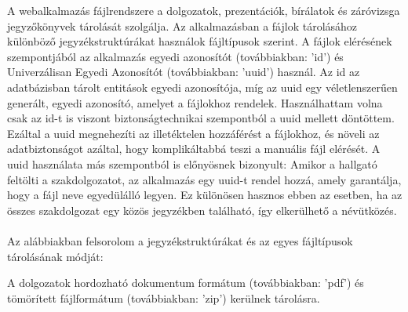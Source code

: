 


A webalkalmazás fájlrendszere a dolgozatok, prezentációk, bírálatok és záróvizsga jegyzőkönyvek tárolását szolgálja. Az alkalmazásban a fájlok tárolásához különböző jegyzékstruktúrákat használok  fájltípusok szerint. A fájlok elérésének szempontjából az alkalmazás egyedi azonosítót (továbbiakban: 'id') és Univerzálisan Egyedi Azonosítót (továbbiakban: 'uuid') használ. Az id az adatbázisban tárolt entitások egyedi azonosítója, míg az uuid egy véletlenszerűen generált, egyedi azonosító, amelyet a fájlokhoz rendelek. Használhattam volna csak az id-t is viszont biztonságtechnikai szempontból a uuid mellett döntöttem. Ezáltal a uuid megnehezíti az illetéktelen hozzáférést a fájlokhoz, és növeli az adatbiztonságot azáltal, hogy komplikáltabbá teszi a manuális fájl elérését. A uuid használata más szempontból is előnyösnek bizonyult: Amikor a hallgató feltölti a szakdolgozatot, az alkalmazás egy uuid-t rendel hozzá, amely garantálja, hogy a fájl neve egyedülálló legyen. Ez különösen hasznos ebben az esetben, ha az összes szakdolgozat egy közös jegyzékben található, így elkerülhető a névütközés.\\
\\
Az alábbiakban felsorolom a jegyzékstruktúrákat és az egyes fájltípusok tárolásának módját:

A dolgozatok hordozható dokumentum formátum (továbbiakban: 'pdf') és tömörített fájlformátum (továbbiakban: 'zip') kerülnek tárolásra.


